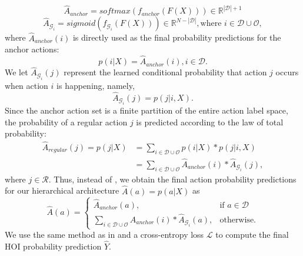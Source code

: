 \begin{equation}
    \hat{A}_{anchor} = softmax(f_{anchor}(F(X))) \in \mathbb{R}^{|\mathcal{D}|+1}
\label{eq:hie_anchor_pred}
\end{equation}
\begin{equation}
    \hat{A}_{\mathcal{G}_i} = sigmoid(f_{\mathcal{G}_i}(F(X))) \in \mathbb{R}^{N-|\mathcal{D}|}, \text{where } i \in \mathcal{D}\cup\mathcal{O},\label{eq:hie_group_pred}
\end{equation}
where $\hat{A}_{anchor}(i)$ is directly used as the final probability predictions for the anchor actions:\begin{equation}
     p(i|X) = \hat{A}_{anchor}(i), i \in \mathcal{D}.
\end{equation}
We let $\hat{A}_{\mathcal{G}_i}(j)$ represent the learned conditional probability that action $j$ occurs when action $i$ is happening, namely, 
\begin{equation}
 \hat{A}_{\mathcal{G}_i}(j) = p(j|i,X).
\end{equation}
Since the anchor action set is a finite partition of the entire action {label} space, the probability of a regular action $j$ is predicted according to the law of total probability:
\begin{equation}
    \begin{split}
    \hat{A}_{regular}(j) = p(j|X) & 
    =\sum_{ i \in \mathcal{D}\cup\mathcal{O}}^{} p(i|X) * p(j|i,X) \\
         & = \sum_{ i \in \mathcal{D}\cup\mathcal{O}}^{} \hat{A}_{anchor}(i) * \hat{A}_{\mathcal{G}_i}(j),\end{split}
\label{eq:hie_regular_pred}
\end{equation}
where $j \in \mathcal{R}$.
Thus, 
instead of ,
we obtain the final action probability predictions for our hierarchical architecture $\hat{A}(a) = p(a|X)$ as 
\begin{equation}
    \hat{A}(a) = \begin{cases}
    \hat{A}_{anchor}(a),
& \text{if } a\in \mathcal{D}\\
    \sum_{ i \in \mathcal{D}\cup\mathcal{O}}^{} \hat{A}_{anchor}(i) * \hat{A}_{\mathcal{G}_i}(a),
& \text{otherwise.}
\end{cases}
\label{eq:hie_action_pred}
\end{equation}
We use the same method as in  and a cross-entropy loss $\mathcal{L}$ to compute the final HOI probability prediction $\hat{Y}$.

